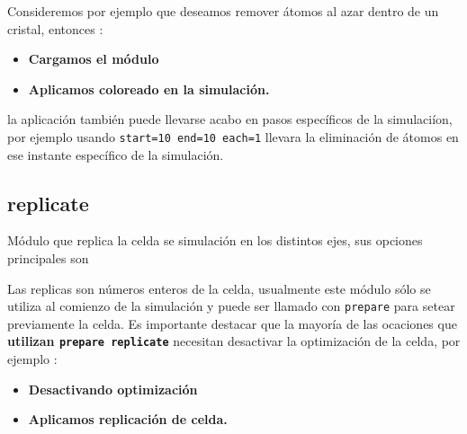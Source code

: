 Consideremos por ejemplo que deseamos remover \'atomos al azar dentro de un cristal, entonces :

\begin{itemize}
 \item \textbf{Cargamos el m\'odulo}
 \item \textbf{Aplicamos coloreado en la simulaci\'on.}
\end{itemize}

la aplicaci\'on tambi\'en puede llevarse acabo en pasos espec\'ificos de la simulaci\'ion, por ejemplo usando \texttt{start=10 end=10 each=1} llevara la eliminaci\'on de \'atomos en ese instante espec\'ifico de la simulaci\'on.

\subsection{replicate}
M\'odulo que replica la celda se simulaci\'on en los distintos ejes, sus opciones principales son


Las replicas son n\'umeros enteros de la celda, usualmente este m\'odulo s\'olo se utiliza al comienzo de la simulaci\'on y puede ser llamado con \verb|prepare| para setear previamente la celda. Es importante destacar que la mayor\'ia de las ocaciones que \textbf{utilizan \texttt{prepare replicate}} necesitan desactivar la optimizaci\'on de la celda, por ejemplo :

\begin{itemize}
 \item \textbf{Desactivando optimizaci\'on}
 \item \textbf{Aplicamos replicaci\'on de celda.}
\end{itemize}

